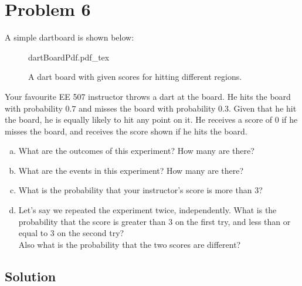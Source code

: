 \section{Problem 6}
A simple dartboard is shown below:

\begin{figure}[!ht]
	\centering
	{dartBoardPdf.pdf_tex}
	\caption{A dart board with given scores for hitting different regions.}
	\label{fig:dartBoard}
\end{figure}

Your favourite EE 507 instructor throws a dart at the board. He hits the board with probability $0.7$ and misses the board with probability $0.3$. Given that he hit the board, he is equally likely to hit any point on it. He receives a score of $0$ if he misses the board, and receives the score shown if he hits the board.

\begin{enumerate}[a.]
	\item What are the outcomes of this experiment? How many are there?
	\item What are the events in this experiment? How many are there?
	\item What is the probability that your instructor's score is more than $3$?
	\item Let's say we repeated the experiment twice, independently. What is the probability that the score is greater than $3$ on the first try, and less than or equal to 3 on the second try?\\
	Also what is the probability that the two scores are different?
\end{enumerate}

\subsection{Solution}

